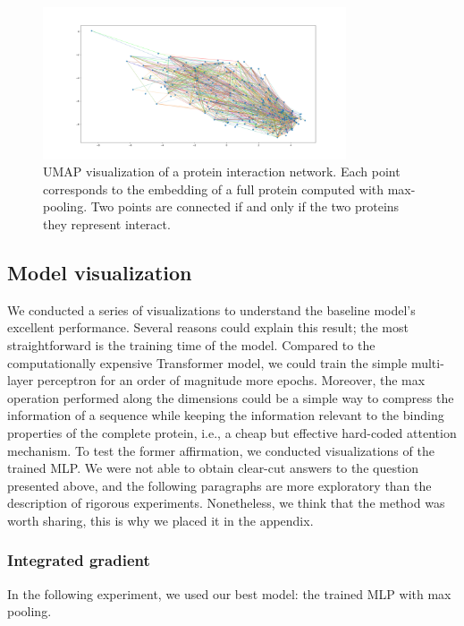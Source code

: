 \documentclass[11pt,a4paper]{article}
\begin{document}
\begin{figure}[ht]
\centering
\includegraphics[width=0.8\textwidth]{images/graph_of_interaction_full_220_seq_lay11.png}
\caption{UMAP visualization of a protein interaction network. Each point corresponds to the embedding of a full protein computed with max-pooling. Two points are connected if and only if the two proteins they represent interact. }
\label{max_pooling_umap_graph}
\end{figure}


\subsection{Model visualization} \label{model_visu_section}

We conducted a series of visualizations to understand the baseline model's excellent performance. Several reasons could explain this result; the most straightforward is the training time of the model. Compared to the computationally expensive Transformer model, we could train the simple multi-layer perceptron for an order of magnitude more epochs. 
Moreover, the max operation performed along the dimensions could be a simple way to compress the information of a sequence while keeping the information relevant to the binding properties of the complete protein, i.e., a cheap but effective hard-coded attention mechanism.
To test the former affirmation, we conducted visualizations of the trained MLP. We were not able to obtain clear-cut answers to the question presented above, and the following paragraphs are more exploratory than the description of rigorous experiments. Nonetheless, we think that the method was worth sharing, this is why we placed it in the appendix.


\subsubsection{Integrated gradient}

In the following experiment, we used our best model: the trained MLP with max pooling.
\end{document}
